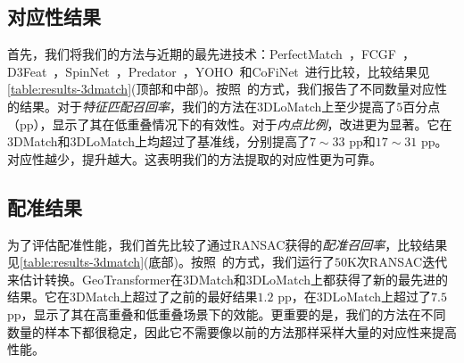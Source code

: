 \subsection{对应性结果}
首先，我们将我们的方法与近期的最先进技术：PerfectMatch~\cite{gojcic2019perfect}，FCGF~\cite{choy2019fully}，D3Feat~\cite{bai2020d3feat}，SpinNet~\cite{ao2021spinnet}，Predator~\cite{huang2021predator}，YOHO~\cite{wang2021you}和CoFiNet~\cite{yu2021cofinet}进行比较，比较结果见\ref{table:results-3dmatch}(顶部和中部)。按照~\cite{bai2020d3feat,huang2021predator}的方式，我们报告了不同数量对应性的结果。对于\emph{特征匹配召回率}，我们的方法在3DLoMatch上至少提高了$5$百分点（pp），显示了其在低重叠情况下的有效性。对于\emph{内点比例}，改进更为显著。它在3DMatch和3DLoMatch上均超过了基准线，分别提高了$7{\sim}33$ pp和$17{\sim}31$ pp。对应性越少，提升越大。这表明我们的方法提取的对应性更为可靠。

\subsection{配准结果}
\label{sec:exp-registration}
为了评估配准性能，我们首先比较了通过RANSAC获得的\emph{配准召回率}，比较结果见\ref{table:results-3dmatch}(底部)。按照~\cite{bai2020d3feat,huang2021predator}的方式，我们运行了$50$K次RANSAC迭代来估计转换。GeoTransformer在3DMatch和3DLoMatch上都获得了新的最先进的结果。它在3DMatch上超过了之前的最好结果$1.2$ pp，在3DLoMatch上超过了$7.5$ pp，显示了其在高重叠和低重叠场景下的效能。更重要的是，我们的方法在不同数量的样本下都很稳定，因此它不需要像以前的方法那样\cite{choy2019fully,ao2021spinnet,wang2021you,yu2021cofinet}采样大量的对应性来提高性能。

